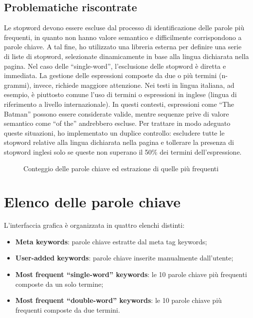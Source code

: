 \subsection{Problematiche riscontrate}

\par Le \gls{stopword} devono essere escluse dal processo di identificazione delle parole più frequenti, in quanto non hanno valore semantico e difficilmente corrispondono a parole chiave. A tal fine, ho utilizzato una libreria esterna per definire una serie di liste di stopword, selezionate dinamicamente in base alla lingua dichiarata nella pagina. Nel caso delle “single-word”, l’esclusione delle stopword è diretta e immediata. La gestione delle espressioni composte da due o più termini (n-grammi), invece, richiede maggiore attenzione. Nei testi in lingua italiana, ad esempio, è piuttosto comune l’uso di termini o espressioni in inglese (lingua di riferimento a livello internazionale). In questi contesti, espressioni come “The Batman” possono essere considerate valide, mentre sequenze prive di valore semantico come “of the” andrebbero escluse. Per trattare in modo adeguato queste situazioni, ho implementato un duplice controllo: escludere tutte le stopword relative alla lingua dichiarata nella pagina e tollerare la presenza di stopword inglesi solo se queste non superano il 50\% dei termini dell’espressione.

\begin{figure}[H]
  \centering 
  \caption{Conteggio delle parole chiave ed estrazione di quelle più frequenti}
\end{figure}

\section{Elenco delle parole chiave}
\label{sec:keyword-list}

\par L'interfaccia grafica è organizzata in quattro elenchi distinti: 
\begin{itemize}
  \item \textbf{Meta keywords}: parole chiave estratte dal meta tag keywords;
  \item \textbf{User-added keywords}: parole chiave inserite manualmente dall'utente;
  \item \textbf{Most frequent “single-word” keywords}: le 10 parole chiave più frequenti composte da un solo termine;
  \item \textbf{Most frequent “double-word” keywords}: le 10 parole chiave più frequenti composte da due termini.
\end{itemize}


